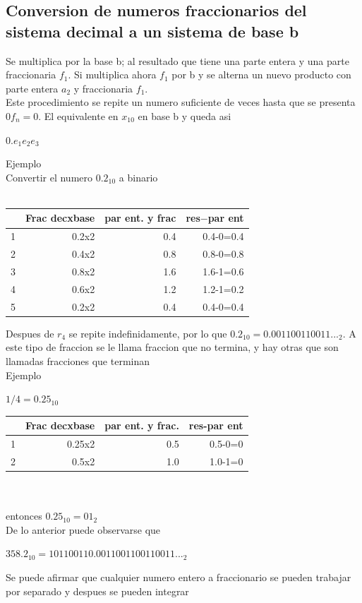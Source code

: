 \documentclass{article}
\begin{document}
\begin{multicols}{2}
\section{Conversion de numeros fraccionarios del sistema decimal a un sistema de base b}
\label{sec:conver}
Se multiplica por la base b; al resultado que tiene una parte entera y una parte fraccionaria $f_{1}$. Si multiplica ahora $f_{1}$ por b y se alterna un nuevo producto con parte entera $a_{2}$ y fraccionaria $f_{1}$.
\\
Este procedimiento se repite un numero suficiente de veces hasta que se presenta $0f_{n}=0$. El equivalente en $x_{10}$ en base b y queda asi 
\begin{center}
$0.e_{1}e_{2}e_{3}$
\end{center}
Ejemplo 
\\
Convertir el numero $0.2_{10}$ a binario
\\
\\
\begin{tabular}{|r|r|r|r|}
\hline
 & Frac decxbase &par ent. y frac & res$-$par ent\\
\hline
1 & 0.2x2 & 0.4 & 0.4-0=0.4 \\
\hline
2 & 0.4x2 & 0.8 & 0.8-0=0.8 \\
\hline
3 & 0.8x2 & 1.6 & 1.6-1=0.6 \\
\hline
4 & 0.6x2 & 1.2 & 1.2-1=0.2 \\
\hline
5 & 0.2x2 & 0.4 & 0.4-0=0.4 \\
\hline
\end{tabular}
Despues de $r_{4}$ se repite indefinidamente, por lo que $0.2_{10}=0.001100110011..._{2}$. A este tipo de fraccion se le llama fraccion que no termina, y hay otras que son llamadas fracciones que terminan
\\
Ejemplo
\begin{center}
$1/4=0.25_{10}$
\end{center}
\begin{tabular}{|r|r|r|r|}
\hline
 & Frac decxbase & par ent. y frac. & res-par ent \\
 \hline
1 & 0.25x2 & 0.5 & 0.5-0=0\\
 \hline
2 & 0.5x2 & 1.0 & 1.0-1=0\\
 \hline
\end{tabular}
\\
\\
entonces $0.25_{10}=01_{2}$
\\
De lo anterior puede observarse que 
\\
\begin{center}
$358.2_{10}=101100110.0011001100110011..._{2}$
\end{center}
Se puede afirmar que cualquier numero entero a fraccionario se pueden trabajar por separado y despues se pueden integrar

\end{multicols}
\end{document}
